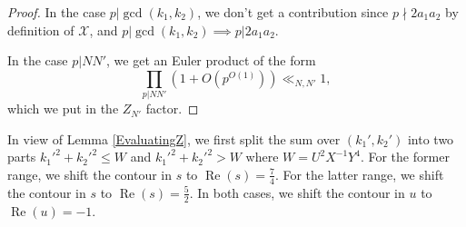 \documentclass[12pt]{amsart}
\def\cX{\mathcal X}
\def\Re{\operatorname{Re}}
\def\gcd{\operatorname{gcd}}
\begin{document}
\begin{proof}
    In the case $p|\gcd(k_1,k_2)$, we don't get a contribution since $p\nmid 2a_1a_2$ by definition of $\cX$, and $p|\gcd(k_1,k_2) \implies p|2a_1a_2$.

    In the case $p| NN'$, we get an Euler product of the form
    $$ \prod_{p| NN'} \left( 1 + O\left( p^{O(1)} \right) \right) \ll_{N, N'} 1 , $$
    which we put in the $Z_{N'}$ factor.

\end{proof}

In view of Lemma \ref{EvaluatingZ}, we first split the sum over $(k_1',k_2')$ into two parts $k_1'^2+k_2'^2 \leq W$ and $k_1'^2+k_2'^2 > W$ where $W=U^2 X^{-1} Y^4$. For the former range, we shift the contour in $s$ to $\Re(s)=\frac{7}{4}$. For the latter range, we shift the contour in $s$ to $\Re(s)=\frac{5}{2}$. In both cases, we shift the contour in $u$ to $\Re(u)=-1$.
\end{document}
